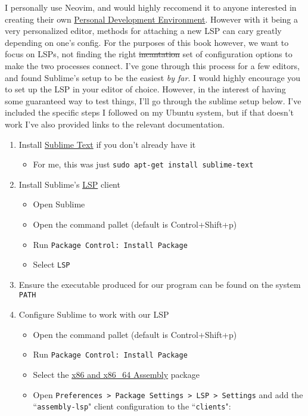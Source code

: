I personally use Neovim, and would highly reccomend it to anyone interested in
creating their own \href{https://www.youtube.com/watch?v=QMVIJhC9Veg}{Personal Development Environment}.
However with it being a very personalized editor, methods for attaching a new LSP
can cary greatly depending on one's config. For the purposes of this book however,
we want to focus on LSPs, not finding the right \st{incantation} set of configuration
options to make the two processes connect. I've gone through this process for a few
editors, and found Sublime's setup to be the easiest \textit{by far}. I would highly
encourage you to set up the LSP in your editor of choice. However, in the interest
of having some guaranteed way to test things, I'll go through the sublime setup below.
I've included the specific steps I followed on my Ubuntu system, but if that doesn't
work I've also provided links to the relevant documentation.

\begin{enumerate}
	\item Install \href{https://www.sublimetext.com/}{Sublime Text} if you don't already have it
	      \begin{itemize}
		      \item For me, this was just \texttt{sudo apt-get install sublime-text}
	      \end{itemize}
      \item Install Sublime's \href{https://github.com/sublimelsp/LSP}{LSP} client
	      \begin{itemize}
		      \item Open Sublime
		      \item Open the command pallet (default is Control+Shift+p)
		      \item Run \texttt{Package Control: Install Package}
		      \item Select \texttt{LSP}
	      \end{itemize}
    \item Ensure the executable produced for our program can be found on the system \texttt{PATH}
	\item Configure Sublime to work with our LSP
	      \begin{itemize}
		      \item Open the command pallet (default is Control+Shift+p)
		      \item Run \texttt{Package Control: Install Package}
		      \item Select the \href{https://packagecontrol.io/packages/x86\%20and\%20x86_64\%20Assembly}{x86 and x86\_64 Assembly} package
		      \item Open \texttt{Preferences > Package Settings > LSP > Settings} and add the ``\texttt{assembly-lsp}" client configuration to the ``\texttt{clients}":
	      \end{itemize}
\end{enumerate}

